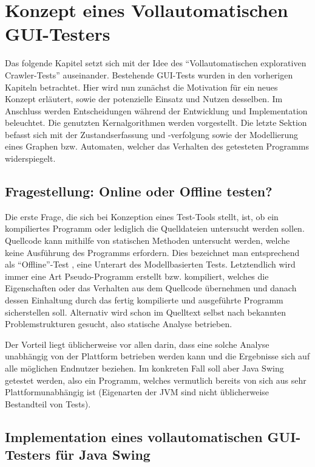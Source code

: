 \chapter{Konzept eines Vollautomatischen GUI-Testers}\label{chapter:conceptfullautoguitesting}


Das folgende Kapitel setzt sich mit der Idee des ``Vollautomatischen explorativen Crawler-Tests''
auseinander. Bestehende GUI-Tests wurden in den vorherigen Kapiteln betrachtet. Hier wird nun zunächst 
die Motivation für ein neues Konzept erläutert, sowie der potenzielle Einsatz und Nutzen desselben.
Im Anschluss werden Entscheidungen während der Entwicklung und Implementation beleuchtet.
Die genutzten Kernalgorithmen werden vorgestellt. Die letzte Sektion befasst sich mit der
Zustandserfassung und -verfolgung sowie der Modellierung eines Graphen bzw. Automaten, welcher
das Verhalten des getesteten Programms widerspiegelt.


\section{Fragestellung: Online oder Offline testen?}\label{section:offoronlinetesting}


Die erste Frage, die sich bei Konzeption eines Test-Tools stellt, ist, ob ein kompiliertes Programm
oder lediglich die Quelldateien untersucht werden sollen. Quellcode kann mithilfe von statischen
Methoden untersucht werden, welche keine Ausführung des Programms erfordern. Dies bezeichnet man
entsprechend als ``Offline''-Test \cite{offlinetesting}, eine Unterart des Modellbasierten Tests.
Letztendlich wird immer eine Art Pseudo-Programm erstellt bzw. kompiliert, welches die
Eigenschaften oder das Verhalten aus dem Quellcode übernehmen und danach dessen Einhaltung durch
das fertig kompilierte und ausgeführte Programm sicherstellen soll. Alternativ wird schon
im Quelltext selbst nach bekannten Problemstrukturen gesucht, also statische Analyse betrieben.

Der Vorteil liegt üblicherweise vor allen darin, dass eine solche Analyse unabhängig von der
Plattform betrieben werden kann und die Ergebnisse sich auf alle möglichen Endnutzer beziehen.
Im konkreten Fall soll aber Java Swing getestet werden, also ein Programm, welches vermutlich
bereits von sich aus sehr Plattformunabhängig ist (Eigenarten der JVM sind nicht üblicherweise
Bestandteil von Tests).


\section{Implementation eines vollautomatischen GUI-Testers für Java Swing}\label{section:myfullautoguitest}


